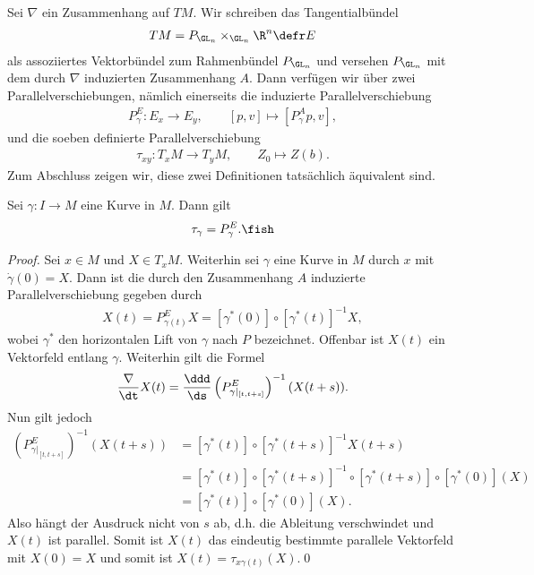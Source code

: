 \documentclass[%
	paper=a5,%
	fleqn,%
	DIV=18,%
	BCOR=0mm,
	fontsize=11pt,
	titlepage=false,%
	bibliography=totoc,
	DIV=18,%
	twoside=true,
	pdftitle=Riemannsche Geometrie,
	pdfauthor=Uwe Semmelmann,
	numbers=noendperiod]%
	{scrbook}
\begin{document}
Sei $\nabla$ ein Zusammenhang auf $TM$. Wir schreiben das Tangentialbündel
\begin{align*}
TM = P_{\GL_n}\times_{\GL_n} \R^n \defr E
\end{align*}
als assoziiertes Vektorbündel zum Rahmenbündel $P_{\GL_n}$ und versehen
$P_{\GL_n}$ mit dem durch $\nabla$ induzierten Zusammenhang $A$. Dann verfügen
wir über zwei Parallelverschiebungen, nämlich einerseits die induzierte
Parallelverschiebung
\begin{align*}
P^E_\gamma: E_x\to E_y,\qquad [p,v]\mapsto [P_\gamma^A p,v], 
\end{align*}
und die soeben definierte Parallelverschiebung
\begin{align*}
\tau_{xy}: T_xM\to T_yM,\qquad Z_0\mapsto Z(b). 
\end{align*}
Zum Abschluss zeigen wir, diese zwei Definitionen tatsächlich äquivalent sind.

\begin{prop}
Sei $\gamma: I\to M$ eine Kurve in $M$. Dann gilt
\begin{align*}
\tau_{\gamma} = P^E_{\gamma}.\fish
\end{align*}
\end{prop}
\begin{proof}
Sei $x\in M$ und $X\in T_xM$. Weiterhin sei $\gamma$ eine Kurve in $M$ durch $x$
mit $\dot{\gamma}(0) = X$. Dann ist die durch den Zusammenhang $A$ induzierte
Parallelverschiebung gegeben durch
\begin{align*}
X(t) = P^E_{\gamma(t)}X = [\gamma^*(0)]\circ [\gamma^*(t)]^{-1}X,
\end{align*}
wobei $\gamma^*$ den horizontalen Lift von $\gamma$ nach $P$ bezeichnet.
Offenbar ist $X(t)$ ein Vektorfeld entlang $\gamma$. Weiterhin gilt die Formel
\begin{align*}
\frac{\nabla}{\dt} X(t) = \frac{\ddd}{\ds}
\left(P_{\gamma|_{[t,t+s]}}^E\right)^{-1}(X(t+s)).
\end{align*}
Nun gilt jedoch
\begin{align*}
\left(P_{\gamma|_{[t,t+s]}}^E\right)^{-1}(X(t+s)) &=
[\gamma^*(t)]\circ [\gamma^*(t+s)]^{-1} X(t+s)\\
&= [\gamma^*(t)]\circ
[\gamma^*(t+s)]^{-1} \circ [\gamma^*(t+s)]\circ [\gamma^*(0)](X)\\
&= [\gamma^*(t)]\circ [\gamma^*(0)](X).
\end{align*}
Also hängt der Ausdruck nicht von $s$ ab, d.h. die Ableitung verschwindet
und $X(t)$ ist parallel. Somit ist $X(t)$ das eindeutig bestimmte parallele
Vektorfeld mit $X(0) = X$ und somit ist $X(t) = \tau_{x\gamma(t)}(X)$.\qed
\end{proof}
\end{document}
